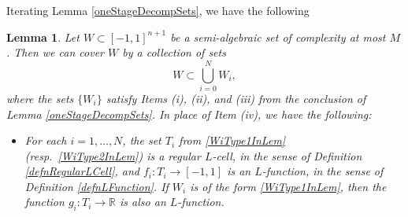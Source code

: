 \documentclass[letterpaper, reqno,11pt]{article}
\numberwithin{equation}{section}
\newcommand{\RR}{\mathbb{R}}
\numberwithin{thm}{section}
\newtheorem{lem}[thm]{Lemma}
\theoremstyle{remark}
\begin{document}
Iterating Lemma \ref{oneStageDecompSets}, we have the following
\begin{lem}\label{iteratedOneStageDecompSets}
Let $W\subset[-1,1]^{n+1}$ be a semi-algebraic set of complexity at most $M$. Then we can cover $W$ by a collection of sets
\[
W \subset\bigcup_{i=0}^N W_i,
\]
where the sets $\{W_i\}$ satisfy Items (i), (ii), and (iii) from the conclusion of Lemma \ref{oneStageDecompSets}. In place of Item (iv), we have the following:

\begin{itemize}
\item[(iv$\:'$)] For each $i=1,\ldots,N$, the set $T_i$ from \eqref{WiType1InLem} (resp.~\eqref{WiType2InLem}) is a regular $L$-cell, in the sense of Definition \ref{defnRegularLCell}, and $f_i\colon T_i\to[-1,1]$ is an $L$-function, in the sense of Definition \ref{defnLFunction}. If $W_i$ is of the form \eqref{WiType1InLem}, then the function $g_i\colon T_i\to\RR$ is also an $L$-function.
\end{itemize}
\end{lem}

\end{document}
